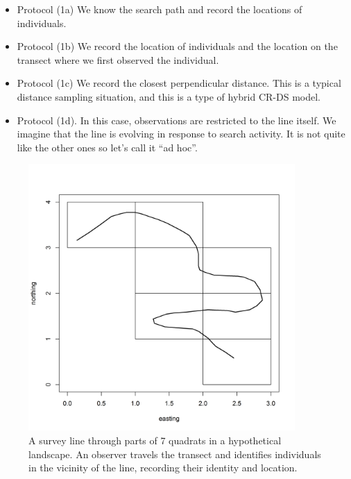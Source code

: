 \begin{itemize}
 \item[] Protocol (1a) We know the search path and record the locations of individuals.
 \item[] Protocol (1b) We record the location of individuals and
   the location on the transect where we first observed the individual.
 \item[] Protocol (1c) We record
the closest perpendicular distance. This is a typical
   distance sampling situation, and this is a type of hybrid CR-DS model.
 \item[] Protocol (1d). In this case, observations are restricted to
   the line itself. We imagine that the line is evolving in response
   to search activity. It is not quite like the other ones so let's
   call it ``ad hoc''.
 \end{itemize}


\begin{figure}
\centering
\includegraphics[width=4in,height=4in]{Ch15-searchencounter/figs/snakeline.png}
\caption{
A survey line through parts of 7 quadrats in a
  hypothetical landscape. An observer travels the transect and
  identifies individuals in the vicinity of the line, recording their
  identity and location.
}
\label{searchencounter.fig.snakeline}
\end{figure}


